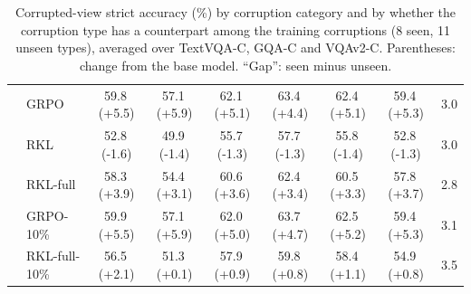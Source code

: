 \begin{table}[t]
\begin{tabular}{llcccc|cc|c}
 & GRPO & 59.8\,{\scriptsize(+5.5)} & 57.1\,{\scriptsize(+5.9)} & 62.1\,{\scriptsize(+5.1)} & 63.4\,{\scriptsize(+4.4)} & 62.4\,{\scriptsize(+5.1)} & 59.4\,{\scriptsize(+5.3)} & 3.0 \\
 & RKL & 52.8\,{\scriptsize(-1.6)} & 49.9\,{\scriptsize(-1.4)} & 55.7\,{\scriptsize(-1.3)} & 57.7\,{\scriptsize(-1.3)} & 55.8\,{\scriptsize(-1.4)} & 52.8\,{\scriptsize(-1.3)} & 3.0 \\
 & RKL-full & 58.3\,{\scriptsize(+3.9)} & 54.4\,{\scriptsize(+3.1)} & 60.6\,{\scriptsize(+3.6)} & 62.4\,{\scriptsize(+3.4)} & 60.5\,{\scriptsize(+3.3)} & 57.8\,{\scriptsize(+3.7)} & 2.8 \\
 & GRPO-10\% & 59.9\,{\scriptsize(+5.5)} & 57.1\,{\scriptsize(+5.9)} & 62.0\,{\scriptsize(+5.0)} & 63.7\,{\scriptsize(+4.7)} & 62.5\,{\scriptsize(+5.2)} & 59.4\,{\scriptsize(+5.3)} & 3.1 \\
 & RKL-full-10\% & 56.5\,{\scriptsize(+2.1)} & 51.3\,{\scriptsize(+0.1)} & 57.9\,{\scriptsize(+0.9)} & 59.8\,{\scriptsize(+0.8)} & 58.4\,{\scriptsize(+1.1)} & 54.9\,{\scriptsize(+0.8)} & 3.5 \\
\bottomrule
\end{tabular}
\caption{Corrupted-view strict accuracy (\%) by corruption category and by whether the
corruption type has a counterpart among the training corruptions (8 seen, 11 unseen types),
averaged over TextVQA-C, GQA-C and VQAv2-C. Parentheses: change from the base model. ``Gap'':
seen minus unseen.}
\label{tab:supp_full_cat}
\end{table}
